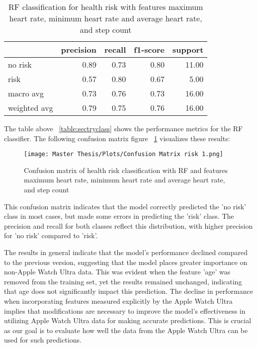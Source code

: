 \begin{table}[H]
\centering
\begin{tabular}{lrrrr}
\toprule
{} & precision & recall & f1-score & support \\
\midrule
no risk & 0.89 & 0.73 & 0.80 & 11.00 \\
risk & 0.57 & 0.80 & 0.67 & 5.00 \\
macro avg & 0.73 & 0.76 & 0.73 & 16.00 \\
weighted avg & 0.79 & 0.75 & 0.76 & 16.00 \\
\bottomrule
\end{tabular}
\caption{RF classification for health risk with features maximum heart rate, minimum heart rate and average heart rate, and step count}
\label{table:firsttryclass}
\end{table}

The table above ~\ref{table:sectryclass} shows the performance metrics for the RF classifier. The following confusion matrix figure ~\ref{fig:ConfusionMatrixrisk1} visualizes these results:

\FloatBarrier
\begin{figure}[h!]
\centering
\texttt{[image: Master Thesis/Plots/Confusion Matrix risk 1.png]}
\caption{Confusion matrix of health risk classification with RF and features maximum heart rate, minimum heart rate and average heart rate, and step count}
\label{fig:ConfusionMatrixrisk1}
\end{figure}
\FloatBarrier

This confusion matrix indicates that the model correctly predicted the 'no risk' class in most cases, but made some errors in predicting the 'risk' class. The precision and recall for both classes reflect this distribution, with higher precision for 'no risk' compared to 'risk'.

The results in general indicate that the model's performance declined compared to the previous version, suggesting that the model places greater importance on non-Apple Watch Ultra data. This was evident when the feature 'age' was removed from the training set, yet the results remained unchanged, indicating that age does not significantly impact this prediction. The decline in performance when incorporating features measured explicitly by the Apple Watch Ultra implies that modifications are necessary to improve the model's effectiveness in utilizing Apple Watch Ultra data for making accurate predictions. This is crucial as our goal is to evaluate how well the data from the Apple Watch Ultra can be used for such predictions.


